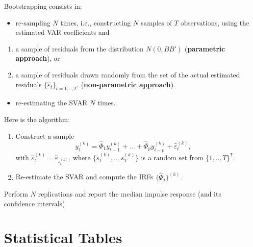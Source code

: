 \documentclass[
  12pt,
]{book}
\providecommand{\tightlist}{%
  \setlength{\itemsep}{0pt}\setlength{\parskip}{0pt}}
\theoremstyle{definition}
\theoremstyle{definition}
\theoremstyle{definition}
\theoremstyle{definition}
\theoremstyle{remark}
\begin{document}
Bootstrapping consists in:

\begin{itemize}
\tightlist
\item
  re-sampling \(N\) times, i.e., constructing \(N\) samples of \(T\) observations, using the estimated
  VAR coefficients and
\end{itemize}

\begin{enumerate}
\def\labelenumi{\alph{enumi}.}
\tightlist
\item
  a sample of residuals from the distribution \(N(0,BB')\) (\textbf{parametric approach}), or
\item
  a sample of residuals drawn randomly from the set of the actual estimated residuals \(\{\hat\varepsilon_t\}_{t=1,..,T}\). (\textbf{non-parametric approach}).
\end{enumerate}

\begin{itemize}
\tightlist
\item
  re-estimating the SVAR \(N\) times.
\end{itemize}

Here is the algorithm:

\begin{enumerate}
\def\labelenumi{\arabic{enumi}.}
\tightlist
\item
  Construct a sample
  \[
  y_t^{(k)}=\widehat{\Phi}_1 y_{t-1}^{(k)} + \dots + \widehat{\Phi}_p y_{t-p}^{(k)} + \hat\varepsilon_t^{(k)},
  \]
  with \(\hat\varepsilon_{t}^{(k)}=\hat\varepsilon_{s_t^{(k)}}\), where \(\{s_1^{(k)},..,s_T^{(k)}\}\) is a random set from \(\{1,..,T\}^T\).
\item
  Re-estimate the SVAR and compute the IRFs \(\{\widehat{\Psi}_j\}^{(k)}\).
\end{enumerate}

Perform \(N\) replications and report the median impulse response (and its confidence intervals).

\hypertarget{statistical-tables}{%
\section{Statistical Tables}\label{statistical-tables}}
\end{document}
